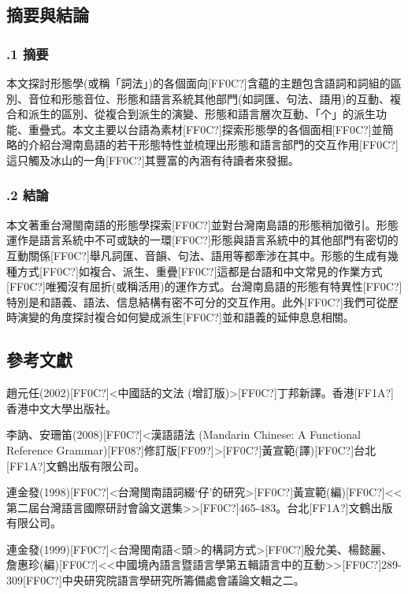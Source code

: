 \subsection{ 摘要與結論}
\subsubsection{.1 摘要}

\textrm{本文探討形態學(或稱「詞法」)的各個面向[FF0C?]含蘊的主題包含語詞和詞組的區別、音位和形態音位、形態和語言系統其他部門(如詞匯、句法、語用)的互動、複合和派生的區別、從複合到派生的演變、形態和語言層次互動、「个」的派生功能、重疊式。本文主要以台語為素材[FF0C?]探索形態學的各個面相[FF0C?]並簡略的介紹台灣南島語的若干形態特性並梳理出形態和語言部門的交互作用[FF0C?]這只觸及冰山的一角[FF0C?]其豐富的內涵有待讀者來發掘。}

\subsubsection{.2 結論}

\textrm{本文著重台灣閩南語的形態學探索[FF0C?]並對台灣南島語的形態稍加徵引。形態運作是語言系統中不可或缺的一環[FF0C?]形態與語言系統中的其他部門有密切的互動關係[FF0C?]舉凡詞匯、音韻、句法、語用等都牽涉在其中。形態的生成有幾種方式[FF0C?]如複合、派生、重疊[FF0C?]這都是台語和中文常見的作業方式[FF0C?]唯獨沒有屈折(或稱活用)的運作方式。台灣南島語的形態有特異性[FF0C?]特別是和語義、語法、信息結構有密不可分的交互作用。此外[FF0C?]我們可從歷時演變的角度探討複合如何變成派生[FF0C?]並和語義的延伸息息相關。}

\subsection{ 參考文獻}

\textrm{趙元任(2002)[FF0C?]<中國話的文法 (增訂版)>[FF0C?]丁邦新譯。香港[FF1A?]香港中文大學出版社。}

\textrm{李訥、安珊笛(2008)[FF0C?]<漢語語法 (Mandarin Chinese: A Functional Reference Grammar)[FF08?]修訂版[FF09?]>[FF0C?]黃宣範(譯)[FF0C?]台北[FF1A?]文鶴出版有限公司。}

\textrm{連金發(1998)[FF0C?]<台灣閩南語詞綴‘仔’的研究>[FF0C?]黃宣範(編)[FF0C?]<<第二屆台灣語言國際研討會論文選集>}\textrm{>}\textrm{[FF0C?]465-483。台北[FF1A?]文鶴出版有限公司。}

\textrm{連金發(1999)[FF0C?]<台灣閩南語<頭>的構詞方式>[FF0C?]殷允美、楊懿麗、詹惠珍(編)[FF0C?]<<中國境內語言暨語言學{\textbullet}第五輯{\textbullet}語言中的互動>>[FF0C?]289-309[FF0C?]中央研究院語言學研究所籌備處會議論文輯之二。}

